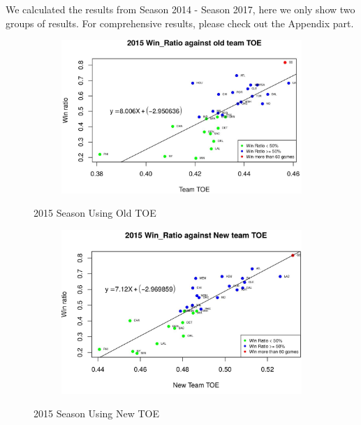 \documentclass[11pt]{article}
\begin{document}
We calculated the results from Season 2014 - Season 2017, here we only show two groups of results. For comprehensive results, please check out the Appendix part.
\begin{figure}[h!]
  \centering
  \begin{subfigure}[b]{0.45\linewidth}
    \includegraphics[width=\linewidth]{15old.jpg}
  \end{subfigure}
      \caption{2015 Season Using Old TOE}
  \begin{subfigure}[b]{0.45\linewidth}
    \includegraphics[width=\linewidth]{15new.jpg}
  \end{subfigure}
    \caption{2015 Season Using New TOE}

\end{figure}
\end{document}
